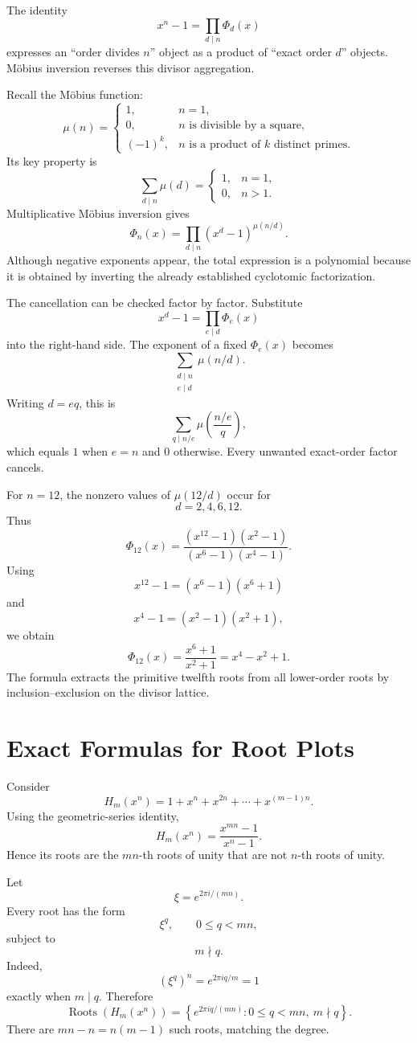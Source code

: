 The identity
\[
  x^n-1=\prod_{d\mid n}\Phi_d(x)
\]
expresses an ``order divides \(n\)'' object as a product of ``exact order \(d\)'' objects.  Möbius inversion reverses this divisor aggregation.

Recall the Möbius function:
\[
  \mu(n)=
  \begin{cases}
  1,&n=1,\\
  0,&n\text{ is divisible by a square},\\
  (-1)^k,&n\text{ is a product of }k\text{ distinct primes}.
  \end{cases}
\]
Its key property is
\[
  \sum_{d\mid n}\mu(d)
  =
  \begin{cases}
  1,&n=1,\\
  0,&n>1.
  \end{cases}
\]
Multiplicative Möbius inversion gives
\[
  \boxed{
  \Phi_n(x)
  =\prod_{d\mid n}(x^d-1)^{\mu(n/d)}.}
\]
Although negative exponents appear, the total expression is a polynomial because it is obtained by inverting the already established cyclotomic factorization.

The cancellation can be checked factor by factor.  Substitute
\[
  x^d-1=\prod_{e\mid d}\Phi_e(x)
\]
into the right-hand side.  The exponent of a fixed \(\Phi_e(x)\) becomes
\[
  \sum_{\substack{d\mid n\\e\mid d}}
  \mu(n/d).
\]
Writing \(d=eq\), this is
\[
  \sum_{q\mid n/e}\mu\left(\frac{n/e}{q}\right),
\]
which equals \(1\) when \(e=n\) and \(0\) otherwise.  Every unwanted exact-order factor cancels.

For \(n=12\), the nonzero values of \(\mu(12/d)\) occur for
\[
  d=2,4,6,12.
\]
Thus
\[
  \Phi_{12}(x)
  =\frac{(x^{12}-1)(x^2-1)}{(x^6-1)(x^4-1)}.
\]
Using
\[
  x^{12}-1=(x^6-1)(x^6+1)
\]
and
\[
  x^4-1=(x^2-1)(x^2+1),
\]
we obtain
\[
  \Phi_{12}(x)
  =\frac{x^6+1}{x^2+1}
  =x^4-x^2+1.
\]
The formula extracts the primitive twelfth roots from all lower-order roots by inclusion--exclusion on the divisor lattice.

\section{Exact Formulas for Root Plots}

Consider
\[
  H_m(x^n)
  =1+x^n+x^{2n}+\cdots+x^{(m-1)n}.
\]
Using the geometric-series identity,
\[
  H_m(x^n)
  =\frac{x^{mn}-1}{x^n-1}.
\]
Hence its roots are the \(mn\)-th roots of unity that are not \(n\)-th roots of unity.

Let
\[
  \xi=e^{2\pi i/(mn)}.
\]
Every root has the form
\[
  \xi^q,
  \qquad
  0\leq q<mn,
\]
subject to
\[
  m\nmid q.
\]
Indeed,
\[
  (\xi^q)^n=e^{2\pi iq/m}=1
\]
exactly when \(m\mid q\).  Therefore
\[
  \boxed{
  \operatorname{Roots}(H_m(x^n))
  =\left\{
  e^{2\pi iq/(mn)}:
  0\leq q<mn,\ m\nmid q
  \right\}.}
\]
There are \(mn-n=n(m-1)\) such roots, matching the degree.


